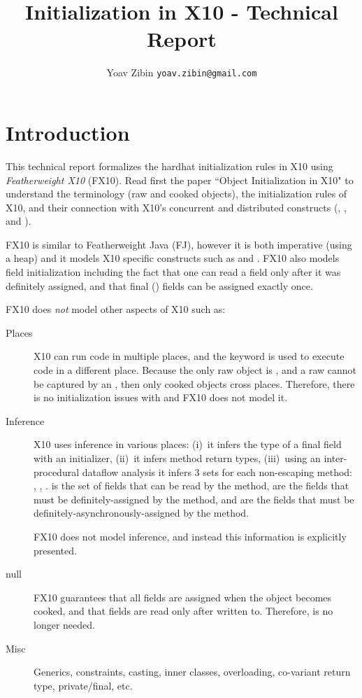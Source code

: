 \documentclass[9pt,a4paper]{article}
\title{Initialization in X10 - Technical Report}
\author{Yoav Zibin \texttt{yoav.zibin@gmail.com}}
\date{}
\begin{document}
\maketitle


\lstset{language=java,basicstyle=\ttfamily\small}

\section{Introduction}
This technical report formalizes the hardhat initialization rules in X10
    using \emph{Featherweight X10} (FX10).
Read first the paper ``Object Initialization in X10" to understand
    the terminology (raw and cooked objects),
    the initialization rules of X10,
    and their connection with X10's concurrent and distributed constructs (\finish, \async, and ).

FX10 is similar to Featherweight Java (FJ), however it is both imperative (using a heap) and it
    models X10 specific constructs such as \finish and \async.
FX10 also models field initialization including the fact that one can read a field only after it was definitely assigned,
    and that final () fields can be assigned exactly once.

FX10 does \emph{not} model other aspects of X10 such as:
\begin{description}
  \item[Places] X10 can run code in multiple places, and the  keyword is used to execute code in a different place.
    Because the only raw object is \this,
        and a raw \this cannot be captured by an ,
        then only cooked objects cross places.
    Therefore, there is no initialization issues with  and FX10 does not model it.
  \item[Inference]
    X10 uses inference in various places:
        (i)~it infers the type of a final field with an initializer,
        (ii)~it infers method return types,
        (iii)~using an inter-procedural dataflow analysis it infers
            3 sets for each non-escaping method: \R, \SW, \AW.
            \R is the set of fields that can be read by the method,
                \SW are the fields that must be definitely-assigned by the method,
                and \AW are the fields that must be definitely-asynchronously-assigned by the method.

    FX10 does not model inference, and instead this information is explicitly presented.
  \item[null]
    FX10 guarantees that all fields are assigned when the object becomes cooked,
        and that fields are read only after written to.
    Therefore, \hnull is no longer needed.

  \item[Misc]
    Generics, constraints, casting, inner classes, overloading, co-variant return type, private/final, etc.
\end{description}
\end{document}
